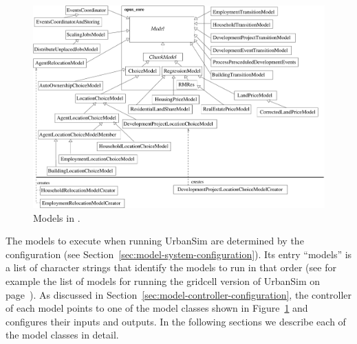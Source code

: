 \begin{figure}[t]
\begin{center}
\includegraphics[scale=0.5]{images/urbansimmodels.pdf}
\caption{\label{fig:urbansim-model}\small Models in .}
\end{center}
\end{figure}

The models \modelsindex to execute when running UrbanSim are determined by the configuration
(see Section~\ref{sec:model-system-configuration}). Its entry ``models'' \modelsindex is a
list of character strings that identify the models \modelsindex to run in that order (see for example 
the list of models for running the gridcell version of UrbanSim on page~\pageref{pg:config-models}).
As discussed in Section~\ref{sec:model-controller-configuration}, 
the controller of each model points to one of the model classes shown in Figure~\ref{fig:urbansim-model}
and configures their inputs and outputs. In the following sections we describe each of the model classes in detail. 

